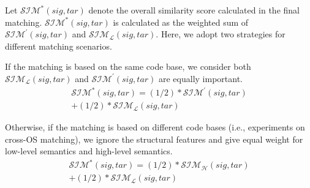 Let $\mathcal{SIM^*}(sig, tar)$ denote the overall similarity score calculated in the final matching. $\mathcal{SIM^*}(sig, tar)$ is calculated as the weighted sum of $\mathcal{SIM^\prime}(sig, tar)$ and  $\mathcal{SIM_{L}}(sig, tar)$. Here, we adopt two strategies for different matching scenarios.

If the matching is based on the same code base, we consider both $\mathcal{SIM_{L}}(sig, tar)$ and $\mathcal{SIM^\prime}(sig, tar)$ are equally important.
\begin{equation}
\begin{aligned}
 \mathcal{SIM^*}(sig, tar) =  (1/2) * \mathcal{SIM^\prime}(sig, tar)  \\
  + (1/2) * \mathcal{SIM_{L}}(sig, tar)
\end{aligned}
\end{equation}


Otherwise, if the matching is based on different code bases (i.e., experiments on cross-OS matching), we ignore the structural features and give equal weight for low-level semantics and high-level semantics.
\begin{equation}
\begin{aligned}
 \mathcal{SIM^*}(sig, tar) =  (1/2) * \mathcal{SIM_H}(sig, tar)  \\
  + (1/2) * \mathcal{SIM_{L}}(sig, tar)
\end{aligned}
\end{equation}

